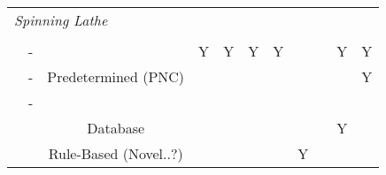 \begin{tabular}{ccccccccccc}
\multicolumn{11}{l}{\textit{Spinning Lathe}} \\                                                                                                       &                                  &                &            &           &           &               &            &              &           \\
               & -                                                                                                       &                                  & Y              & Y          & Y         & Y         &               &            & Y            & Y         \\
               & -                                                                                                       & Predetermined (PNC)              &                &            &           &           &               &            &              & Y         \\
               & -                                                                                                       &                                  &                &            &           &           &               &            &              &           \\
               & \citep{Henkenjohann2005AnProcess}                                                                               & Database                         &                &            &           &           &               &            & Y            &           \\
               & \citep{Polyblank2015ParametricSpinning}                                                                         & Rule-Based (Novel..?)            &                &            &           &           & Y             &            &              &    \\
\bottomrule			   
\end{tabular}